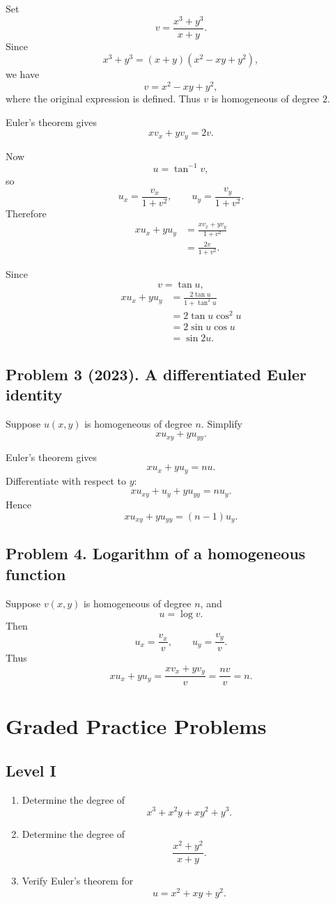 \documentclass[11pt,oneside]{book}
\theoremstyle{studentthm}
\theoremstyle{definition}
\begin{document}
Set
\[
v=\frac{x^3+y^3}{x+y}.
\]
Since
\[
x^3+y^3=(x+y)(x^2-xy+y^2),
\]
we have
\[
v=x^2-xy+y^2,
\]
where the original expression is defined. Thus \(v\) is homogeneous
of degree \(2\).

Euler's theorem gives
\[
xv_x+yv_y=2v.
\]

Now
\[
u=\tan^{-1}v,
\]
so
\[
u_x=\frac{v_x}{1+v^2},
\qquad
u_y=\frac{v_y}{1+v^2}.
\]
Therefore
\[
\begin{aligned}
xu_x+yu_y
&=
\frac{xv_x+yv_y}{1+v^2}\\
&=
\frac{2v}{1+v^2}.
\end{aligned}
\]

Since
\[
v=\tan u,
\]
\[
\begin{aligned}
xu_x+yu_y
&=
\frac{2\tan u}{1+\tan^2u}\\
&=
2\tan u\cos^2u\\
&=
2\sin u\cos u\\
&=
\sin2u.
\end{aligned}
\]

\subsection*{Problem 3 (2023). A differentiated Euler identity}
Suppose \(u(x,y)\) is homogeneous of degree \(n\). Simplify
\[
xu_{xy}+yu_{yy}.
\]

Euler's theorem gives
\[
xu_x+yu_y=nu.
\]
Differentiate with respect to \(y\):
\[
xu_{xy}+u_y+yu_{yy}=nu_y.
\]
Hence
\[
xu_{xy}+yu_{yy}=(n-1)u_y.
\]

\subsection*{Problem 4. Logarithm of a homogeneous function}
Suppose \(v(x,y)\) is homogeneous of degree \(n\), and
\[
u=\log v.
\]
Then
\[
u_x=\frac{v_x}{v},
\qquad
u_y=\frac{v_y}{v}.
\]
Thus
\[
xu_x+yu_y
=
\frac{xv_x+yv_y}{v}
=
\frac{nv}{v}
=
n.
\]

\section{Graded Practice Problems}

\subsection*{Level I}
\begin{enumerate}
\item Determine the degree of
\[
x^3+x^2y+xy^2+y^3.
\]
\item Determine the degree of
\[
\frac{x^2+y^2}{x+y}.
\]
\item Verify Euler's theorem for
\[
u=x^2+xy+y^2.
\]
\end{enumerate}
\end{document}
